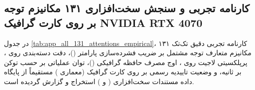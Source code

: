 \subsection*{کارنامه تجربی و سنجش سخت‌افزاری ۱۳۱ مکانیزم توجه بر روی کارت گرافیک NVIDIA RTX 4070}
در جدول \ref{tab:app_all_131_attentions_empirical}، کارنامه تجربی دقیق تک‌تک ۱۳۱ مکانیزم متعارف توجه مشتمل بر ضریب فشرده‌سازی پارامتر ()، دقت دسته‌بندی روی ، پرپلکسیتی لاجیت روی ، اوج مصرف حافظه گرافیکی ()، توان عملیاتی بر حسب توکن بر ثانیه، و وضعیت تاییدیه رسمی بر روی کارت گرافیک  (معماری ) مستقیماً از پایگاه داده مستندات سخت‌افزاری ( و ) استخراج و گزارش گردیده است.

